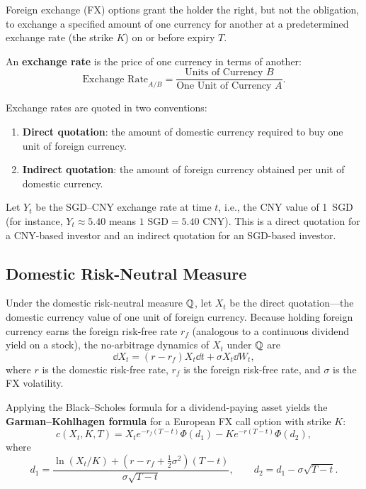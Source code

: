 Foreign exchange (FX) options grant the holder the right, but not the obligation, to exchange a specified amount of one currency for another at a predetermined exchange rate (the strike $K$) on or before expiry $T$.

\begin{definition}\label{def:exchange-rate}
    An \textbf{exchange rate} is the price of one currency in terms of another:
    \[
    \text{Exchange Rate}_{A/B} = \frac{\text{Units of Currency } B}{\text{One Unit of Currency } A}.
    \]
\end{definition}

Exchange rates are quoted in two conventions:
\begin{enumerate}
    \item \textbf{Direct quotation}: the amount of domestic currency required to buy one unit of foreign currency.
    \item \textbf{Indirect quotation}: the amount of foreign currency obtained per unit of domestic currency.
\end{enumerate}

\begin{example}
    Let $Y_t$ be the SGD--CNY exchange rate at time $t$, i.e., the CNY value of 1~SGD (for instance, $Y_t \approx 5.40$ means $1\text{ SGD} = 5.40\text{ CNY}$). This is a direct quotation for a CNY-based investor and an indirect quotation for an SGD-based investor.
\end{example}

\subsection*{Domestic Risk-Neutral Measure}

Under the domestic risk-neutral measure $\mathbb{Q}$, let $X_t$ be the direct quotation---the domestic currency value of one unit of foreign currency. Because holding foreign currency earns the foreign risk-free rate $r_f$ (analogous to a continuous dividend yield on a stock), the no-arbitrage dynamics of $X_t$ under $\mathbb{Q}$ are
\[
\dd X_t = (r - r_f) X_t \dd t + \sigma X_t \dd W_t,
\]
where $r$ is the domestic risk-free rate, $r_f$ is the foreign risk-free rate, and $\sigma$ is the FX volatility.

Applying the Black--Scholes formula for a dividend-paying asset yields the \textbf{Garman--Kohlhagen formula} for a European FX call option with strike $K$:
\[
c(X_t, K, T) = X_t e^{-r_f(T-t)}\Phi(d_1) - K e^{-r(T-t)}\Phi(d_2),
\]
where
\[
d_1 = \frac{\ln(X_t/K) + \left(r - r_f + \frac{1}{2}\sigma^2\right)(T - t)}{\sigma\sqrt{T - t}}, \qquad d_2 = d_1 - \sigma\sqrt{T - t}.
\]

